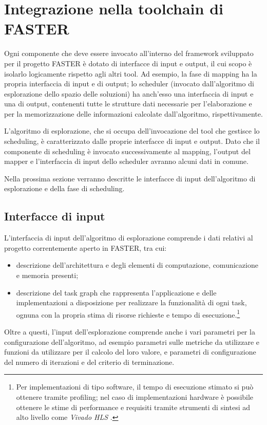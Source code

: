 \section{Integrazione nella toolchain di \acs{FASTER}}
\label{sec:integrazioneToolchainFASTER}

Ogni componente che deve essere invocato all'interno del framework sviluppato
per il progetto \ac{FASTER} \`e dotato di interfacce di input e output, il cui
scopo \`e isolarlo logicamente rispetto agli altri tool.
Ad esempio, la fase di mapping ha la propria interfaccia di input e di output; lo scheduler 
(invocato dall'algoritmo di esplorazione dello spazio delle soluzioni) ha 
anch'esso una interfaccia di input e una di output, contenenti tutte 
le strutture dati necessarie per l'elaborazione e per la memorizzazione delle 
informazioni calcolate dall'algoritmo, rispettivamente. 



L'algoritmo di esplorazione, che si occupa dell'invocazione del tool che gestisce lo 
scheduling, è caratterizzato dalle proprie interfacce di input e output. Dato che il componente
di scheduling \`e invocato successivamente al mapping, l'output del mapper e l'interfaccia
di input dello scheduler avranno alcuni dati in comune.

Nella prossima sezione verranno descritte le interfacce di input dell'algoritmo di esplorazione
e della fase di scheduling.

\subsection{Interfacce di input}

L'interfaccia di input dell'algoritmo di esplorazione comprende i dati relativi al
progetto correntemente aperto in \ac{FASTER}, tra cui:
\begin{itemize}
  \item descrizione dell'architettura e degli elementi di computazione, comunicazione
    e memoria presenti;
  \item descrizione del task graph che rappresenta l'applicazione e delle implementazioni
    a disposizione per realizzare la funzionalit\`a di ogni task, ognuna con la propria stima
    di risorse richieste e tempo di esecuzione.\footnote{Per implementazioni di tipo software, il tempo di esecuzione
    stimato si pu\`o ottenere tramite profiling; nel caso di implementazioni hardware \`e possibile
    ottenere le stime di performance e requisiti tramite strumenti di sintesi ad alto
    livello come \emph{Vivado HLS} \cite{VivadoHLS}.}
\end{itemize}
Oltre a questi, l'input dell'esplorazione comprende anche i vari parametri per la configurazione
dell'algoritmo, ad esempio parametri sulle metriche da utilizzare e funzioni da utilizzare per il calcolo
del loro valore, e parametri di configurazione del numero di iterazioni e del criterio di terminazione.


